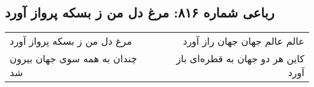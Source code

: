 \begin{center}
\section*{رباعی شماره ۸۱۶: مرغ دل من ز بسکه پرواز آورد}
\label{sec:0816}
\begin{longtable}{l p{0.5cm} r}
مرغ دل من ز بسکه پرواز آورد
&&
عالم عالم جهان جهان راز آورد
\\
چندان به همه سوی جهان بیرون شد
&&
کاین هر دو جهان به قطره‌ای باز آورد
\\
\end{longtable}
\end{center}
